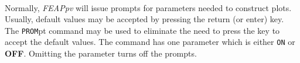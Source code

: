  \\{\smallskip}
\headb

Normally, {\sl FEAPpv} will issue prompts for parameters needed to
construct plots.  Usually, default values may be accepted by pressing
the return (or enter) key.  The {\tt PROM}pt command may be used to
eliminate the need to press the key to accept the default values.  The
command has one parameter which is either {\tt ON} or {\bf OFF}.  Omitting
the parameter turns off the prompts.
\vfill
\eject
